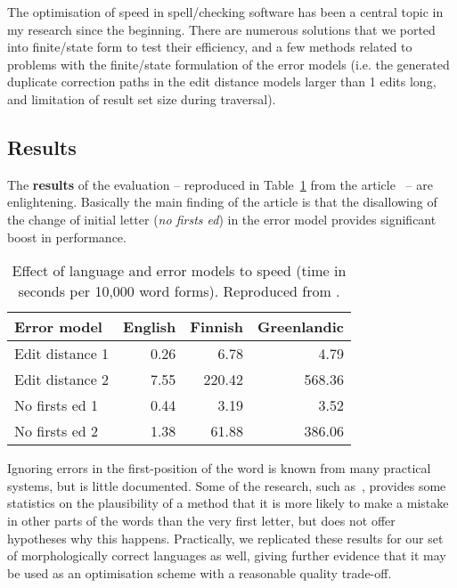 \documentclass[officiallayout,final]{unihelcompling}
\begin{document}
The optimisation of speed in spell\-/checking software has been a central topic
in my research since the beginning. There are numerous solutions that we ported
into finite\-/state form to test their efficiency, and a few methods related to
problems with the finite\-/state formulation of the error models (i.e.  the
generated duplicate correction paths in the edit distance models larger than 1
edits long, and limitation of result set size during traversal).

\subsection{Results}

The \textbf{results} of the evaluation -- reproduced in
Table~\ref{table:fsmnlp-2012-repro} from the
article~ -- are enlightening. Basically the main
finding of the article is that the disallowing of the change of initial letter
(\emph{no firsts ed}) in the error model provides significant boost in
performance.

\begin{table}
    \centering
\begin{tabular}{|l|rrr|} \hline \bf Error model & \bf English & \bf Finnish &
    \bf Greenlandic \\ \hline Edit distance 1 & 0.26&6.78&4.79 \\ Edit distance
    2 & 7.55&220.42&568.36 \\
No firsts ed 1 & 0.44&3.19&3.52 \\ No firsts ed 2 & 1.38&61.88&386.06 \\
\hline \end{tabular}

    \caption{Effect of language and error models to speed (time in seconds per 
        10,000 word forms). Reproduced from .
    \label{table:fsmnlp-2012-repro}}
\end{table}

Ignoring errors in the first-position of the word is known from many practical
systems, but is little documented. Some of the research, such
as~\citet{bhagat2007spelling}, provides some statistics on the plausibility of
a method that it is more likely to make a mistake in other parts of the words
than the very first letter, but does not offer hypotheses why this happens.
Practically, we replicated these results for our set of morphologically correct
languages as well, giving further evidence that it may be used as an
optimisation scheme with a reasonable quality trade-off.
\end{document}
